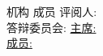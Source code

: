\begin{titlepage}
\vspace{1cm}
{\xiaosi
\begin{tabbing}
        \hspace{9cm} \= 机构 \hspace{4em} \= 成员 \kill
        \> 评阅人: \> \underline{\phantom{XXXXXXXXX}} \\
        \> 答辩委员会: \> \underline{主席:\phantom{XXXXXX}} \\
        \> \> \underline{成员:\phantom{XXXXXX}} \\
        \> \> \underline{\phantom{XXXXXXXXX}} \\
\end{tabbing}
}

\end{titlepage}
